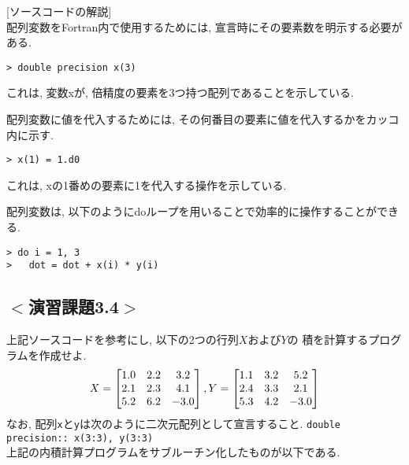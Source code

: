 

[ソースコードの解説]\\
配列変数をFortran内で使用するためには, 宣言時にその要素数を明示する必要がある. 

\begin{Verbatim}[frame=single]
> double precision x(3)
\end{Verbatim}
これは, 変数{\ttfamily x}が, 倍精度の要素を3つ持つ配列であることを示している. 

配列変数に値を代入するためには, その何番目の要素に値を代入するかをカッコ内に示す. 
\begin{Verbatim}[frame=single]
> x(1) = 1.d0
\end{Verbatim}
これは, {\ttfamily x}の1番めの要素に1を代入する操作を示している. 

配列変数は, 以下のように{\ttfamily do}ループを用いることで効率的に操作することができる. 
\begin{Verbatim}[frame=single]
> do i = 1, 3
>   dot = dot + x(i) * y(i)
\end{Verbatim}
\fi

\subsection*{$<$演習課題3.4$>$}
上記ソースコードを参考にし, 以下の2つの行列$X$および$Y$の
積を計算するプログラムを作成せよ. 
\begin{equation}
X =
\begin{bmatrix}
  1.0 & 2.2 & 3.2 \\
  2.1 & 2.3 & 4.1 \\
  5.2 & 6.2 & -3.0\\
\end{bmatrix},\\
Y =
\begin{bmatrix}
  1.1 & 3.2 &  5.2 \\
  2.4 & 3.3 &  2.1 \\
  5.3 & 4.2 & -3.0 \\
\end{bmatrix}
\end{equation}
なお, 配列\verb|x|と\verb|y|は次のように二次元配列として宣言すること. 
\verb|double precision:: x(3:3), y(3:3)|\\


上記の内積計算プログラムをサブルーチン化したものが以下である. 

